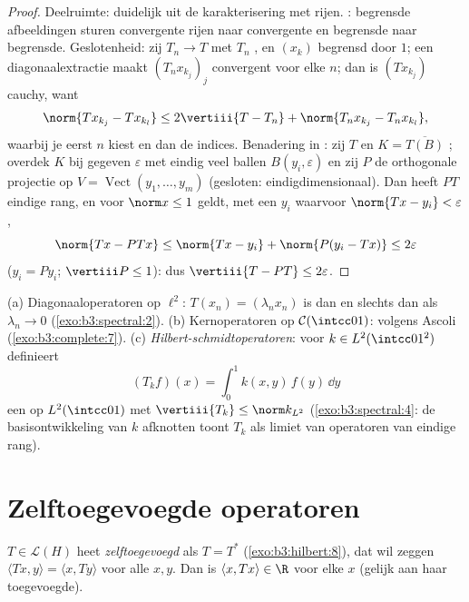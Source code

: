 \begin{proof}
Deelruimte: duidelijk uit de karakterisering met rijen. :
begrensde afbeeldingen sturen convergente rijen naar convergente
en begrensde naar begrensde. Geslotenheid: zij $T_n \to T$ met
$T_n$ , en $(x_k)$ begrensd door $1$; een
diagonaalextractie maakt $(T_nx_{k_j})_j$ convergent voor elke
$n$; dan is $(Tx_{k_j})$ cauchy, want
\[
\norm{Tx_{k_j} - Tx_{k_l}} \leq 2\vertiii{T - T_n} +
\norm{T_nx_{k_j} - T_nx_{k_l}} ,
\]
waarbij je eerst $n$ kiest en dan de indices. Benadering in
: zij $T$  en $K = \overline{T(B)}$
; overdek $K$ bij gegeven $\varepsilon$ met eindig veel
ballen $B(y_i, \varepsilon)$ en zij $P$ de orthogonale projectie
op $V = \operatorname{Vect}(y_1, \dots, y_m)$ (gesloten:
eindigdimensionaal). Dan heeft $PT$ eindige rang, en voor $\norm
x \leq 1$ geldt, met een $y_i$ waarvoor $\norm{Tx - y_i} <
\varepsilon$,
\[
\norm{Tx - PTx} \leq \norm{Tx - y_i} + \norm{P(y_i - Tx)}
\leq 2\varepsilon
\]
($y_i = Py_i$; $\vertiii P \leq 1$): dus $\vertiii{T - PT} \leq
2\varepsilon$.
\end{proof}

\begin{example}\label{ex:b3:spectral:examples}
(a) Diagonaaloperatoren op $\ell^2$: $T(x_n) = (\lambda_nx_n)$ is
 dan en slechts dan als $\lambda_n \to 0$
(\cref{exo:b3:spectral:2}).
(b) Kernoperatoren op $\mathcal C(\intcc01)$:  volgens
Ascoli (\cref{exo:b3:complete:7}).
(c) \emph{Hilbert-schmidtoperatoren}:
voor $k \in L^2(\intcc01^2)$ definieert
\[
(T_kf)(x) = \int_0^1k(x, y)\,f(y)\,\dd y
\]
een  op $L^2(\intcc01)$ met $\vertiii{T_k} \leq
\norm k_{L^2}$ (\cref{exo:b3:spectral:4}: de basisontwikkeling
van $k$ afknotten toont $T_k$ als limiet van operatoren van
eindige rang).
\end{example}

\section{Zelftoegevoegde operatoren}

\begin{definition}\label{def:b3:spectral:selfadjoint}
$T \in \mathcal L(H)$ heet
\emph{zelftoegevoegd} als $T =
T^*$ (\cref{exo:b3:hilbert:8}), dat wil zeggen $\langle Tx,
y\rangle = \langle x, Ty\rangle$ voor alle $x, y$. Dan is
$\langle x, Tx\rangle \in \R$ voor elke $x$ (gelijk aan haar
toegevoegde).
\end{definition}

